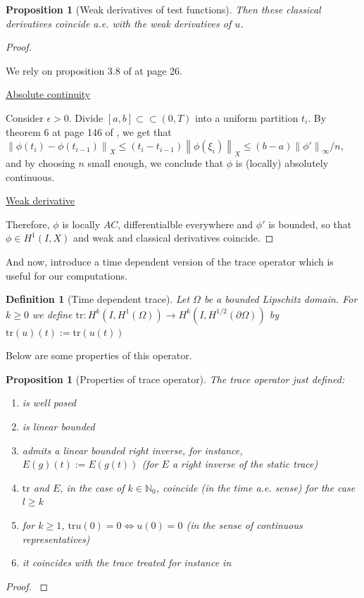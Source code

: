 \documentclass[english,a4paper,9pt,oneside]{scrbook}	%
\theoremstyle{break}
\newtheorem{defn}[equation]{Definition}
\newtheorem{prop}[equation]{Proposition}
\newenvironment{mproof}[1][\proofname]{%
  \begin{proof}[#1]$ $\par\nobreak\ignorespaces
}{%
  \end{proof}
}
\renewcommand*{\proofname}{Proof}
\theoremstyle{remark}
\newcommand{\ds}{\displaystyle}
\newcommand{\norm}[1]{\left\lVert#1\right\rVert}
\newcommand{\tr}{\text{tr}}
\newcommand{\cc}{\subset\subset}
\begin{document}
\begin{appendices}
\begin{prop}[Weak derivatives of test functions]
Then these classical derivatives coincide a.e. with the weak derivatives of $u$.

\end{prop}
\begin{mproof}


We rely on proposition 3.8 of \cite{kreuter} at page 26.

\underline{Absolute continuity}

Consider $\epsilon >0$. Divide $[a,b] \cc (0,T)$ into a uniform partition $t_i$. By theorem 6 at page 146 of \cite{mvt}, we get that $\ds \norm{\phi(t_i)-\phi(t_{i-1})}_X \leq (t_i-t_{i-1})\norm{\phi(\xi_i)}_X\leq (b-a) \norm{\phi'}_{\infty}/n$, and by choosing $n$ small enough, we conclude that $\phi$ is (locally) absolutely continuous.

\underline{Weak derivative}

Therefore, $\phi$ is locally $AC$, differentialble everywhere and $\phi'$ is bounded, so that $\phi \in H^1(I,X)$ and weak and classical derivatives coincide. 

\end{mproof}

And now, introduce a time dependent version of the trace operator which is useful for our computations.

\begin{defn}[Time dependent trace]
Let $\Omega$ be a bounded Lipschitz domain. For $k\geq 0$ we define $\tr: H^k(I,H^1(\Omega))\rightarrow H^k(I, H^{1/2} (\partial \Omega))$ by $\tr(u)(t):=\tr(u(t))$
\end{defn}

Below are some properties of this operator.

\begin{prop}[Properties of trace operator]
\label{prop:trace}
The trace operator just defined:
\begin{enumerate}
\item is well posed
\item is linear bounded
\item admits a linear bounded right inverse, for instance, $E(g)(t):=E(g(t))$ (for $E$ a right inverse of the static trace)
\item $\tr$ and $E$, in the case of $k \in \mathbb{N}_0$, coincide (in the time a.e. sense) for the case $l\geq k$
\item for $k\geq 1$, $\tr u(0)=0 \iff u(0)=0$ (in the sense of continuous representatives)
\item it coincides with the trace treated for instance in \cite{lions}
\end{enumerate}
\end{prop}
\begin{mproof}


\end{mproof}
\end{appendices}
\end{document}
